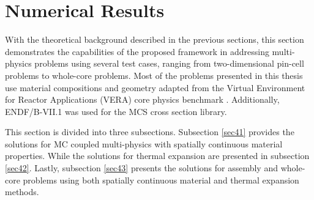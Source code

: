 \newpage 
\section{Numerical Results} \label{s4}
With the theoretical background described in the previous sections, this section demonstrates the capabilities of the proposed framework in addressing multi-physics problems using several test cases, ranging from two-dimensional pin-cell problems to whole-core problems. Most of the problems presented in this thesis use material compositions and geometry adapted from the Virtual Environment for Reactor Applications (VERA) core physics benchmark \cite{godfrey}. Additionally, ENDF/B-VII.1 was used for the MCS cross section library.

This section is divided into three subsections. Subsection \ref{sec41} provides the solutions for MC coupled multi-physics with spatially continuous material properties. While the solutions for thermal expansion are presented in subsection \ref{sec42}. Lastly, subsection \ref{sec43} presents the solutions for assembly and whole-core problems using both spatially continuous material and thermal expansion methods.


\clearpage

\clearpage
